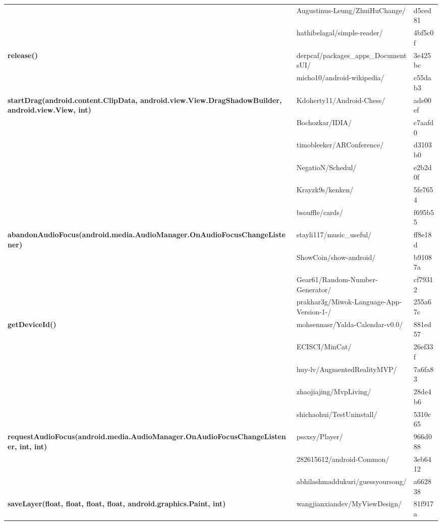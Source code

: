 \begin{longtable}{ |p{12em}|p{6em}|p{4em} | }
 & Augustinus-Leung/ZhuiHuChange/ & d5ced81\\\cline{2-3}
 & hathibelagal/simple-reader/ & 4bf5c0f\\\cline{2-3}
 \hline
 \multirow{2}{*}{\textbf{release()}} & derpcaf/packages_apps_DocumentsUI/ & 3e425bc\\\cline{2-3}
 & micho10/android-wikipedia/ & c55dab3\\\cline{2-3}
 \hline
 \multirow{6}{*}{\textbf{startDrag(android.content.ClipData, android.view.View.DragShadowBuilder, android.view.View, int)}} & Kdoherty11/Android-Chess/ & ade00ef\\\cline{2-3}
 & Bochozkar/IDIA/ & c7aafd0\\\cline{2-3}
 & timobleeker/ARConference/ & d3103b0\\\cline{2-3}
 & NegatioN/Schedul/ & e2b2d0f\\\cline{2-3}
 & Krayzk9s/kenken/ & 5fe7654\\\cline{2-3}
 & bsouffle/cards/ & f695b55\\\cline{2-3}
 \hline
 \multirow{4}{*}{\textbf{abandonAudioFocus(android.media.AudioManager.OnAudioFocusChangeListener)}} & stayli117/music_useful/ & ff8e18d\\\cline{2-3}
 & ShowCoin/show-android/ & b91087a\\\cline{2-3}
 & Gear61/Random-Number-Generator/ & cf79312\\\cline{2-3}
 & prakhar3g/Miwok-Language-App-Version-1-/ & 255a67c\\\cline{2-3}
 \hline
 \multirow{5}{*}{\textbf{getDeviceId()}} & mohsennasr/Yalda-Calendar-v0.0/ & 881ed57\\\cline{2-3}
 & ECISCI/MinCat/ & 26ef33f\\\cline{2-3}
 & huy-lv/AugmentedRealityMVP/ & 7a6fa83\\\cline{2-3}
 & zhaojiajing/MvpLiving/ & 28de4b6\\\cline{2-3}
 & shichaohui/TestUninstall/ & 5310c65\\\cline{2-3}
 \hline
 \multirow{3}{*}{\textbf{requestAudioFocus(android.media.AudioManager.OnAudioFocusChangeListener, int, int)}} & pssxsy/Player/ & 966d088\\\cline{2-3}
 & 282615612/android-Common/ & 3eb6412\\\cline{2-3}
 & abhilashmaddukuri/guessyoursong/ & a662838\\\cline{2-3}
 \hline
 \multirow{5}{*}{\textbf{saveLayer(float, float, float, float, android.graphics.Paint, int)}} & wangjianxiandev/MyViewDesign/ & 81f917a\\\cline{2-3}

\end{longtable}
